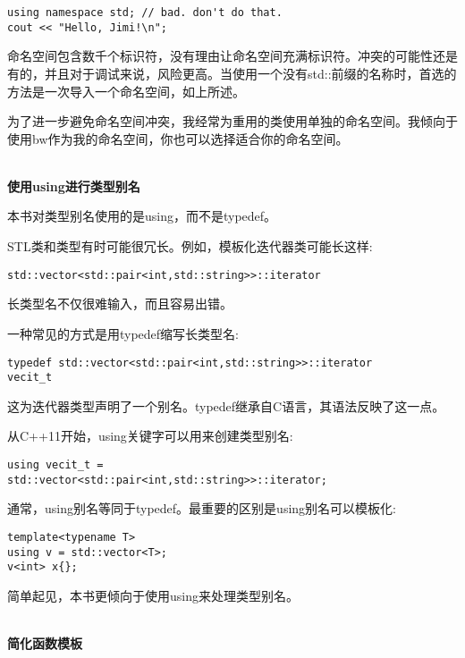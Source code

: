 \begin{lstlisting}[style=styleCXX]
using namespace std; // bad. don't do that.
cout << "Hello, Jimi!\n";
\end{lstlisting}

命名空间包含数千个标识符，没有理由让命名空间充满标识符。冲突的可能性还是有的，并且对于调试来说，风险更高。当使用一个没有std::前缀的名称时，首选的方法是一次导入一个命名空间，如上所述。

为了进一步避免命名空间冲突，我经常为重用的类使用单独的命名空间。我倾向于使用bw作为我的命名空间，你也可以选择适合你的命名空间。

\hspace*{\fill} \\ %
\noindent
\textbf{使用using进行类型别名}

本书对类型别名使用的是using，而不是typedef。

STL类和类型有时可能很冗长。例如，模板化迭代器类可能长这样:

\begin{lstlisting}[style=styleCXX]
std::vector<std::pair<int,std::string>>::iterator
\end{lstlisting}

长类型名不仅很难输入，而且容易出错。

一种常见的方式是用typedef缩写长类型名:

\begin{lstlisting}[style=styleCXX]
typedef std::vector<std::pair<int,std::string>>::iterator
vecit_t
\end{lstlisting}

这为迭代器类型声明了一个别名。typedef继承自C语言，其语法反映了这一点。

从C++11开始，using关键字可以用来创建类型别名:

\begin{lstlisting}[style=styleCXX]
using vecit_t =
std::vector<std::pair<int,std::string>>::iterator;
\end{lstlisting}

通常，using别名等同于typedef。最重要的区别是using别名可以模板化:

\begin{lstlisting}[style=styleCXX]
template<typename T>
using v = std::vector<T>;
v<int> x{};
\end{lstlisting}

简单起见，本书更倾向于使用using来处理类型别名。

\hspace*{\fill} \\ %
\noindent
\textbf{简化函数模板}

